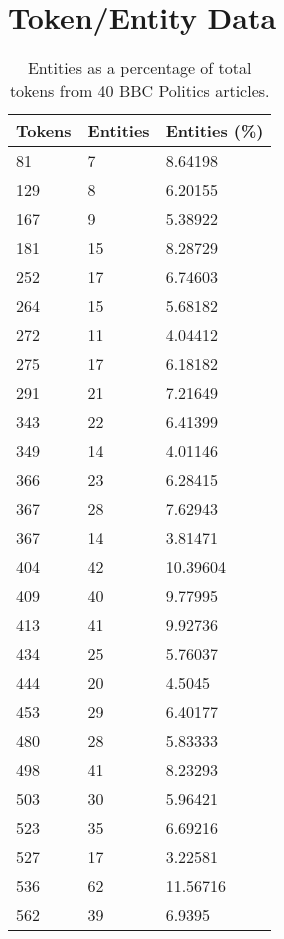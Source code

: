 \section{Token/Entity Data}

\begin{longtable}[c]{|l|l|l|}
\caption{Entities as a percentage of total tokens from 40 BBC Politics articles.}\label{tab:entitiestokens} \\    %
\hline
Tokens & Entities & Entities (\%) \\
\hline\hline\endhead
81     & 7        & 8.64198       \\
129    & 8        & 6.20155       \\
167    & 9        & 5.38922       \\
181    & 15       & 8.28729       \\
252    & 17       & 6.74603       \\
264    & 15       & 5.68182       \\
272    & 11       & 4.04412       \\
275    & 17       & 6.18182       \\
291    & 21       & 7.21649       \\
343    & 22       & 6.41399       \\
349    & 14       & 4.01146       \\
366    & 23       & 6.28415       \\
367    & 28       & 7.62943       \\
367    & 14       & 3.81471       \\
404    & 42       & 10.39604      \\
409    & 40       & 9.77995       \\
413    & 41       & 9.92736       \\
434    & 25       & 5.76037       \\
444    & 20       & 4.5045        \\
453    & 29       & 6.40177       \\
480    & 28       & 5.83333       \\
498    & 41       & 8.23293       \\
503    & 30       & 5.96421       \\
523    & 35       & 6.69216       \\
527    & 17       & 3.22581       \\
536    & 62       & 11.56716      \\
562    & 39       & 6.9395        \\

\end{longtable}
